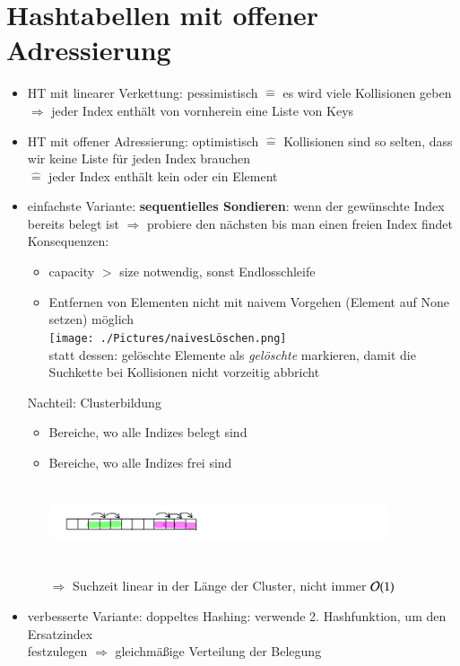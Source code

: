 \section{Hashtabellen mit offener Adressierung}
\begin{itemize}
    \item HT mit linearer Verkettung: pessimistisch $\widehat{=}$ es wird viele Kollisionen geben\\ \hspace*{3cm}$\Rightarrow$ jeder Index enthält von vornherein eine Liste von Keys
    \item HT mit offener Adressierung: optimistisch $\widehat{=}$ Kollisionen sind so selten, dass wir keine Liste für jeden Index brauchen\\ \hspace*{3cm}$\widehat{=}$ jeder Index enthält kein oder ein Element
    \item einfachste Variante: \textbf{sequentielles Sondieren}: wenn der gewünschte Index bereits belegt ist $\Rightarrow$ probiere den nächsten bis man einen freien Index findet \\
    Konsequenzen:
    \begin{itemize}
        \item capacity $>$ size notwendig, sonst Endlosschleife
        \item Entfernen von Elementen nicht mit naivem Vorgehen (Element auf None setzen) möglich\\
        \texttt{[image: ./Pictures/naivesLöschen.png]}\\
        statt dessen: gelöschte Elemente als \emph{gelöschte} markieren, damit die Suchkette bei Kollisionen nicht vorzeitig abbricht
    \end{itemize}
    Nachteil: Clusterbildung
    \begin{itemize}
        \item Bereiche, wo alle Indizes belegt sind
        \item Bereiche, wo alle Indizes frei sind\\
        \includegraphics[width=10cm,height=3cm,keepaspectratio]{./Pictures/buntesArray.png}\\
        $\Rightarrow$ Suchzeit linear in der Länge der Cluster, nicht immer $\mathcal{O}{}(1)$
    \end{itemize}
    \item verbesserte Variante: doppeltes Hashing: verwende 2. Hashfunktion, um den Ersatzindex\\ \hspace*{5mm}festzulegen $\Rightarrow$ gleichmäßige Verteilung der Belegung
\end{itemize}

